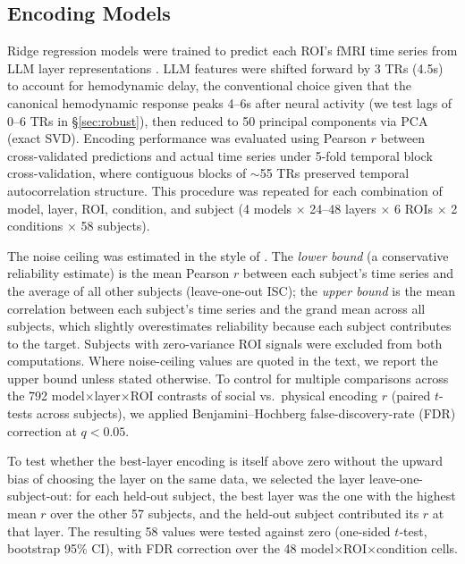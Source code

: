 \documentclass[conference]{IEEEtran}
\begin{document}
\subsection{Encoding Models}

Ridge regression models were trained to predict each ROI's fMRI time series from LLM layer representations \cite{caucheteux2022brains, goldstein2022shared}. LLM features were shifted forward by 3 TRs (4.5s) to account for hemodynamic delay, the conventional choice given that the canonical hemodynamic response peaks 4--6s after neural activity (we test lags of 0--6 TRs in \S\ref{sec:robust}), then reduced to 50 principal components via PCA (exact SVD). Encoding performance was evaluated using Pearson $r$ between cross-validated predictions and actual time series under 5-fold temporal block cross-validation, where contiguous blocks of $\sim$55 TRs preserved temporal autocorrelation structure. This procedure was repeated for each combination of model, layer, ROI, condition, and subject (4 models $\times$ 24--48 layers $\times$ 6 ROIs $\times$ 2 conditions $\times$ 58 subjects).

The noise ceiling was estimated in the style of \cite{kriegeskorte2008representational,nastase2021narratives}. The \emph{lower bound} (a conservative reliability estimate) is the mean Pearson $r$ between each subject's time series and the average of all other subjects (leave-one-out ISC); the \emph{upper bound} is the mean correlation between each subject's time series and the grand mean across all subjects, which slightly overestimates reliability because each subject contributes to the target. Subjects with zero-variance ROI signals were excluded from both computations. Where noise-ceiling values are quoted in the text, we report the upper bound unless stated otherwise. To control for multiple comparisons across the 792 model$\times$layer$\times$ROI contrasts of social vs.\ physical encoding $r$ (paired $t$-tests across subjects), we applied Benjamini--Hochberg false-discovery-rate (FDR) correction at $q < 0.05$.

To test whether the best-layer encoding is itself above zero without the upward bias of choosing the layer on the same data, we selected the layer leave-one-subject-out: for each held-out subject, the best layer was the one with the highest mean $r$ over the other 57 subjects, and the held-out subject contributed its $r$ at that layer. The resulting 58 values were tested against zero (one-sided $t$-test, bootstrap 95\% CI), with FDR correction over the 48 model$\times$ROI$\times$condition cells.
\end{document}
